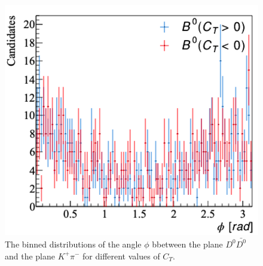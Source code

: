 \begin{figure}[h]
\center
\includegraphics*[width=0.43\linewidth]{CM_variables_B0/planeangle}
\caption{The binned distributions of the angle $\phi$ bbetween the plane $D^0\bar{D^0}$ and the plane $K^+\pi^-$ for different values of $C_T$.}
\label{phi}
\end{figure}
\clearpage

